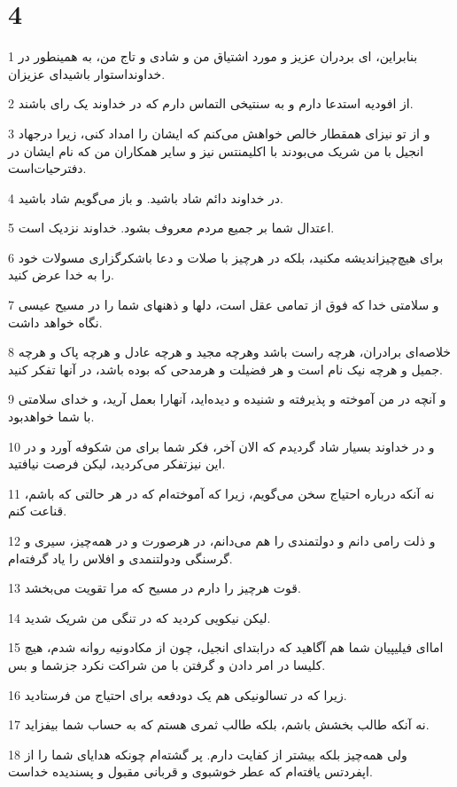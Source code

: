 \chapter{4}

\par 1 بنابراین، ای بردران عزیز و مورد اشتیاق من و شادی و تاج من، به همینطور در خداونداستوار باشید‌ای عزیزان.
\par 2 از افودیه استدعا دارم و به سنتیخی التماس دارم که در خداوند یک رای باشند.
\par 3 و از تو نیز‌ای همقطار خالص خواهش می‌کنم که ایشان را امداد کنی، زیرا درجهاد انجیل با من شریک می‌بودند با اکلیمنتس نیز و سایر همکاران من که نام ایشان در دفترحیات‌است.
\par 4 در خداوند دائم شاد باشید. و باز می‌گویم شاد باشید.
\par 5 اعتدال شما بر جمیع مردم معروف بشود. خداوند نزدیک است.
\par 6 برای هیچ‌چیزاندیشه مکنید، بلکه در هرچیز با صلات و دعا باشکرگزاری مسولات خود را به خدا عرض کنید.
\par 7 و سلامتی خدا که فوق از تمامی عقل است، دلها و ذهنهای شما را در مسیح عیسی نگاه خواهد داشت.
\par 8 خلاصه‌ای برادران، هرچه راست باشد وهرچه مجید و هرچه عادل و هرچه پاک و هرچه جمیل و هرچه نیک نام است و هر فضیلت و هرمدحی که بوده باشد، در آنها تفکر کنید.
\par 9 و آنچه در من آموخته و پذیرفته و شنیده و دیده‌اید، آنهارا بعمل آرید، و خدای سلامتی با شما خواهدبود.
\par 10 و در خداوند بسیار شاد گردیدم که الان آخر، فکر شما برای من شکوفه آورد و در این نیزتفکر می‌کردید، لیکن فرصت نیافتید.
\par 11 نه آنکه درباره احتیاج سخن می‌گویم، زیرا که آموخته‌ام که در هر حالتی که باشم، قناعت کنم.
\par 12 و ذلت رامی دانم و دولتمندی را هم می‌دانم، در هرصورت و در همه‌چیز، سیری و گرسنگی ودولتنمدی و افلاس را یاد گرفته‌ام.
\par 13 قوت هرچیز را دارم در مسیح که مرا تقویت می‌بخشد.
\par 14 لیکن نیکویی کردید که در تنگی من شریک شدید.
\par 15 اما‌ای فیلیپیان شما هم آگاهید که درابتدای انجیل، چون از مکادونیه روانه شدم، هیچ کلیسا در امر دادن و گرفتن با من شراکت نکرد جزشما و بس.
\par 16 زیرا که در تسالونیکی هم یک دودفعه برای احتیاج من فرستادید.
\par 17 نه آنکه طالب بخشش باشم، بلکه طالب ثمری هستم که به حساب شما بیفزاید.
\par 18 ولی همه‌چیز بلکه بیشتر از کفایت دارم. پر گشته‌ام چونکه هدایای شما را از اپفردتس یافته‌ام که عطر خوشبوی و قربانی مقبول و پسندیده خداست.
